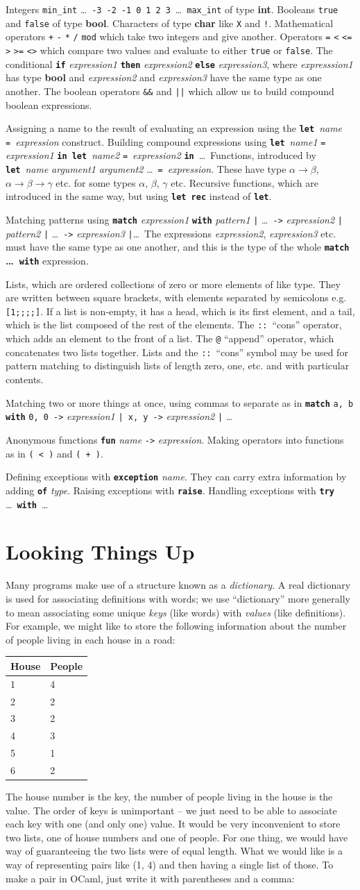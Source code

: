 \documentclass[]{book}
\makeatletter
\newcommand\upquote[1]{\textquotesingle#1\textquotesingle}
\newcommand{\sofarstartingoff}{

\noindent 1

\noindent Integers \texttt{min\_int} \ldots\ \texttt{-3}\ \texttt{-2}\ \texttt{-1}\ \texttt{0}\ \texttt{1}\ \texttt{2}\ \texttt{3}\ \ldots\ \texttt{max\_int} of type \textbf{\textrm{int}}. Booleans \texttt{true} and \texttt{false} of type \textbf{\textrm{bool}}. \noindent Characters of type \textrm{\textbf{char}} like \texttt{\upquote{X}} and \texttt{\upquote{!}}. Mathematical operators \texttt{+} \texttt{-} \texttt{*} \texttt{/} \texttt{mod} which take two integers and give another. Operators \texttt{=} \texttt{<} \texttt{<=} \texttt{>} \texttt{>=} \texttt{<>} which compare two values and evaluate to either \texttt{true} or \texttt{false}. The conditional \textbf{\texttt{if}} \textit{expression1} \textbf{\texttt{then}} \textit{expression2} \textbf{\texttt{else}} \textit{expression3}, where \textit{expresssion1} has type \textrm{\textbf{bool}} and \textit{expression2} and \textit{expression3} have the same type as one another. The boolean operators \texttt{\&\&} and \texttt{||} which allow us to build compound boolean expressions.}
\newcommand{\sofarfunctions}
{
\noindent 2

\noindent Assigning a name to the result of evaluating an expression using the \textbf{\texttt{let}}\ \textit{name} \texttt{=}\ \textit{expression} construct. Building compound expressions using \textbf{\texttt{let}}\ \textit{name1} \texttt{=} \textit{expression1} \textbf{\texttt{in}}\ \textbf{\texttt{let}}\ \textit{name2} \texttt{=}\ \textit{expression2} \textbf{\texttt{in}}\ \ldots \ Functions, introduced by \textbf{\texttt{let}}\ \textit{name} \textit{argument1} \textit{argument2} \ldots\ \texttt{=}\ \textit{expression}. These have type $\alpha \rightarrow \beta$, $\alpha \rightarrow \beta \rightarrow \gamma$ etc. for some types $\alpha$, $\beta$, $\gamma$ etc. Recursive functions, which are introduced in the same way, but using \textbf{\texttt{let rec}} instead of \textbf{\texttt{let}}.}
\newcommand{\sofarcasebycase}
{\noindent 3

\noindent Matching patterns using \textbf{\texttt{match}} \textit{expression1} \textbf{\texttt{with}} \textit{pattern1} \texttt{|} \ldots\ \texttt{->} \textit{expression2} \texttt{|} \textit{pattern2} \texttt{|} \ldots\ \texttt{->} \textit{expression3} \texttt{|}\ldots \ The expressions \textit{expression2}, \textit{expression3} etc. must have the same type as one another, and this is the type of the whole \textbf{\texttt{match} \ldots\ \texttt{with}} expression.}
\newcommand{\sofarlistingthings}
{
\noindent 4

\noindent Lists, which are ordered collections of zero or more elements of like type. They are written between square brackets, with elements separated by semicolons e.g. \texttt{[1;\! 2;\! 3;\! 4;\! 5]}. If a list is non-empty, it has a head, which is its first element, and a tail, which is the list composed of the rest of the elements. The \texttt{::}\ ``cons'' operator, which adds an element to the front of a list. The \texttt{@} ``append'' operator, which concatenates two lists together. Lists and the \texttt{::}\ ``cons'' symbol may be used for pattern matching to distinguish lists of length zero, one, etc. and with particular contents.}
\newcommand{\sofarsortingthings}
{
\noindent 5

\noindent Matching two or more things at once, using commas to separate as in \texttt{\textbf{match}} \texttt{a, b} \textbf{\texttt{with}} \texttt{0, 0 ->} \textit{expression1} \texttt{|\ x, y ->} \textit{expression2} \texttt{|} \ldots
}
\newcommand{\sofarfunctionsuponfunctions}
{
\noindent 6

\noindent Anonymous functions \textbf{\texttt{fun}} \textit{name} \texttt{->} \textit{expression}. Making operators into functions as in \texttt{(\! <\! )} and \texttt{(\! +\! )}.
}
\newcommand{\sofarwhenthingsgowrong}
{
\noindent 7

\noindent Defining exceptions with \textbf{\texttt{exception}} \textit{name}. They can carry extra information by adding \textbf{\texttt{of}} \textit{type}. Raising exceptions with \textbf{\texttt{raise}}. Handling exceptions with \textbf{\texttt{try}} \ldots\ \textbf{\texttt{with}}\ \ldots}
\newcommand{\smspace}{\vspace{4mm}}
\makeatother
\begin{document}
{\footnotesize
\sofarstartingoff

\vspace{\baselineskip}
\sofarfunctions

\vspace{\baselineskip}
\sofarcasebycase

\vspace{\baselineskip}
\sofarlistingthings

\vspace{\baselineskip}
\sofarsortingthings

\vspace{\baselineskip}
\sofarfunctionsuponfunctions

\vspace{\baselineskip}
\sofarwhenthingsgowrong
}

\pagestyle{empty}


\chapter{Looking Things Up}
\pagestyle{fancy}
\label{lookingthingsup}

Many programs make use of a structure known as a \textit{dictionary}. A real dictionary is used for associating definitions with words; we use ``dictionary'' more generally to mean associating some unique \textit{keys} (like words) with \textit{values} (like definitions). For example, we might like to store the following information about the number of people living in each house in a road:

\smspace
\noindent\begin{tabular}{@{}ll@{}} \toprule
House & People\\ \midrule
1 & 4\\
2 & 2\\
3 & 2\\
4 & 3\\
5 & 1\\
6 & 2\\ \bottomrule
\end{tabular}
\smspace

\noindent The house number is the key, the number of people living in the house is the value. The order of keys is unimportant -- we just need to be able to associate each key with one (and only one) value. It would be very inconvenient to store two lists, one of house numbers and one of people. For one thing, we would have way of guaranteeing the two lists were of equal length. What we would like is a way of representing pairs like (1, 4) and then having a single list of those. To make a pair in OCaml, just write it with parentheses and a comma:
\end{document}
